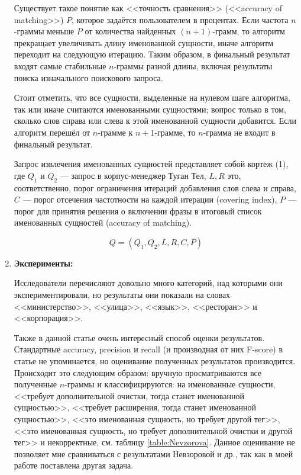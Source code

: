 \begin{enumerate}
Существует такое понятие как <<точность сравнения>> (<<accuracy of matching>>) $P$, которое задаётся пользователем в процентах. Если частота $n$-граммы меньше $P$ от количества найденных $(n+1)$-грамм, то алгоритм прекращает увеличивать длину именованной сущности, иначе алгоритм переходит на следующую итерацию. Таким образом, в финальный результат входят самые стабильные $n$-граммы разной длины, включая результаты поиска изначального поискового запроса.

Стоит отметить, что все сущности, выделенные на нулевом шаге алгоритма, так или иначе считаются именованными сущностями; вопрос только в том, сколько слов справа или слева к этой именованной сущности добавится. Если алгоритм перешёл от $n$-грамме к $n+1$-грамме, то $n$-грамма не входит в финальный результат.

Запрос извлечения именованных сущностей представляет собой кортеж (1), где $Q_1$ и $Q_2$ --- запрос в корпус-менеджер Туган Тел\cite{tugan_tel}, $L, R$ это, соответственно, порог ограничения итераций добавления слов слева и справа, $C$ --- порог отсечения частотности на каждой итерации (covering index), $P$ --- порог для принятия решения о включении фразы в итоговый список именованных сущностей (accuracy of matching).

\[Q = (Q_1, Q_2, L, R, C, P)\]

\item\textbf{Эксперименты:}

Исследователи перечисляют довольно много категорий, над которыми они экспериментировали, но результаты они показали на словах <<министерство>>, <<улица>>, <<язык>>, <<ресторан>> и <<корпорация>>.

Также в данной статье очень интересный способ оценки результатов. Стандартные accuracy, precision и recall (и производная от них F-score) в статье не упоминается, но оценивание полученных результатов производится. Происходит это следующим образом: вручную просматриваются все полученные $n$-граммы и классифицируются: на именованные сущности, <<требует дополнительной очистки, тогда станет именованной сущностью>>, <<требует расширения, тогда станет именованной сущностью>>, <<это именованная сущность, но требует другой тег>>,  <<это именованная сущность, но требует дополнительной очистки и другой тег>> и некорректные, см. таблицу \ref{table:Nevzorova}. Данное оценивание не позволяет мне сравниваться с результатами Невзоровой и др., так как в моей работе поставлена другая задача.

\end{enumerate}

